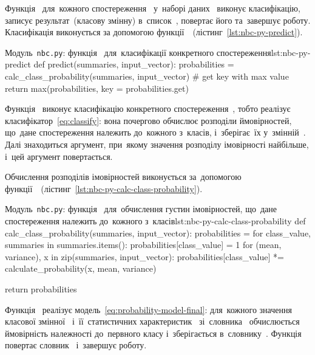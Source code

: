 \documentclass[
	a4paper,
	oneside,
	DIV = 12,
	fontsize = 13pt,
	headings = normal,
	numbers = endperiod,
	bibliography = totoc, %
]{scrartcl}
\theoremstyle{mythm}
\newcommand{\filename}[1]{\texttt{#1}}
\begin{document}
						Функція~ для~кожного спостереження~ у~наборі даних~ виконує класифікацію, записує результат~(класову змінну) в~список~, повертає його та~завершує роботу. Класифікація виконується за допомогою функції~~(лістинг~\ref{lst:nbc-py-predict}).

						\begin{listingpython}{Модуль~\filename{nbc.py}: функція~ для~класифікації конкретного спостереження}{lst:nbc-py-predict}
		def predict(summaries, input_vector):
				probabilities = calc_class_probability(summaries, input_vector)
				# get key with max value
				return max(probabilities, key = probabilities.get)
						\end{listingpython}

						Функція~ виконує класифікацію конкретного спостереження~, тобто реалізує класифікатор~\eqref{eq:classify}: вона почергово обчислює розподіли ймовірностей, що~дане спостереження належить до~кожного з~класів, і~зберігає~їх у~змінній~. Далі знаходиться аргумент, при~якому значення розподілу імовірності найбільше, і~цей аргумент повертається. 

						Обчислення розподілів імовірностей виконується за~допомогою функції~~(лістинг~\ref{lst:nbc-py-calc-class-probability}).

						\begin{listingpython}[toprule = 0pt, bottomrule = 0pt]{Модуль~\filename{nbc.py}: функція~ для~обчислення густин імовірностей, що~дане спостереження належить до~кожного з~класів}{lst:nbc-py-calc-class-probability}
		def calc_class_probability(summaries, input_vector):
				probabilities = {}
				for class_value, summaries in summaries.items():
						probabilities[class_value] = 1
						for (mean, variance), x in zip(summaries, input_vector):
								probabilities[class_value] *= calculate_probability(x, mean, variance)

				return probabilities
						\end{listingpython}

						Функція~ реалізує модель~\eqref{eq:probability-model-final}: для~кожного значення класової змінної~ і~її~статистичних характеристик~\pyinline{summaries} зі~словника~ обчислюється ймовірність належності до~первного класу і~зберігається в~словнику~. Функція повертає словник~ і~завершує роботу.
\end{document}
